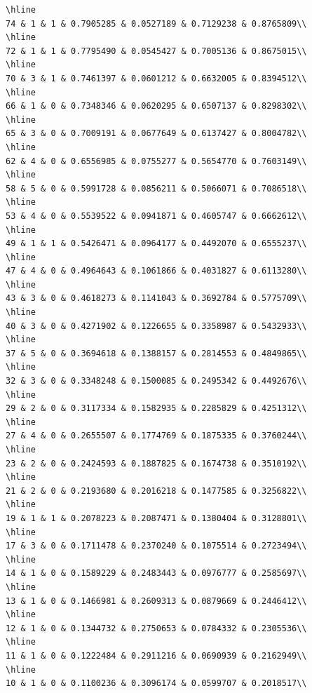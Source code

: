 \documentclass[
]{article}
\begin{document}
\begin{verbatim}
\hline
74 & 1 & 1 & 0.7905285 & 0.0527189 & 0.7129238 & 0.8765809\\
\hline
72 & 1 & 1 & 0.7795490 & 0.0545427 & 0.7005136 & 0.8675015\\
\hline
70 & 3 & 1 & 0.7461397 & 0.0601212 & 0.6632005 & 0.8394512\\
\hline
66 & 1 & 0 & 0.7348346 & 0.0620295 & 0.6507137 & 0.8298302\\
\hline
65 & 3 & 0 & 0.7009191 & 0.0677649 & 0.6137427 & 0.8004782\\
\hline
62 & 4 & 0 & 0.6556985 & 0.0755277 & 0.5654770 & 0.7603149\\
\hline
58 & 5 & 0 & 0.5991728 & 0.0856211 & 0.5066071 & 0.7086518\\
\hline
53 & 4 & 0 & 0.5539522 & 0.0941871 & 0.4605747 & 0.6662612\\
\hline
49 & 1 & 1 & 0.5426471 & 0.0964177 & 0.4492070 & 0.6555237\\
\hline
47 & 4 & 0 & 0.4964643 & 0.1061866 & 0.4031827 & 0.6113280\\
\hline
43 & 3 & 0 & 0.4618273 & 0.1141043 & 0.3692784 & 0.5775709\\
\hline
40 & 3 & 0 & 0.4271902 & 0.1226655 & 0.3358987 & 0.5432933\\
\hline
37 & 5 & 0 & 0.3694618 & 0.1388157 & 0.2814553 & 0.4849865\\
\hline
32 & 3 & 0 & 0.3348248 & 0.1500085 & 0.2495342 & 0.4492676\\
\hline
29 & 2 & 0 & 0.3117334 & 0.1582935 & 0.2285829 & 0.4251312\\
\hline
27 & 4 & 0 & 0.2655507 & 0.1774769 & 0.1875335 & 0.3760244\\
\hline
23 & 2 & 0 & 0.2424593 & 0.1887825 & 0.1674738 & 0.3510192\\
\hline
21 & 2 & 0 & 0.2193680 & 0.2016218 & 0.1477585 & 0.3256822\\
\hline
19 & 1 & 1 & 0.2078223 & 0.2087471 & 0.1380404 & 0.3128801\\
\hline
17 & 3 & 0 & 0.1711478 & 0.2370240 & 0.1075514 & 0.2723494\\
\hline
14 & 1 & 0 & 0.1589229 & 0.2483443 & 0.0976777 & 0.2585697\\
\hline
13 & 1 & 0 & 0.1466981 & 0.2609313 & 0.0879669 & 0.2446412\\
\hline
12 & 1 & 0 & 0.1344732 & 0.2750653 & 0.0784332 & 0.2305536\\
\hline
11 & 1 & 0 & 0.1222484 & 0.2911216 & 0.0690939 & 0.2162949\\
\hline
10 & 1 & 0 & 0.1100236 & 0.3096174 & 0.0599707 & 0.2018517\\

\end{verbatim}
\end{document}

